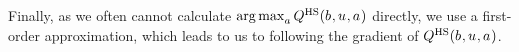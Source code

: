 Finally, as we often cannot calculate $\operatorname*{arg\,max}_{a} Q^{\text{HS}}(b_{ }, u_{ }, a_{ })$ directly, we use a first-order approximation, which leads to us to following the gradient of $Q^{\text{HS}}(b_{ }, u_{ }, a_{ })$.




